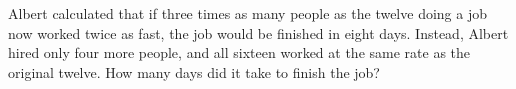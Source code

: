 Albert calculated that if three times as many people as the twelve doing a job now worked twice as fast, the job would be finished in eight days. Instead, Albert hired only four more people, and all sixteen worked at the same rate as the original twelve. How many days did it take to finish the job?
